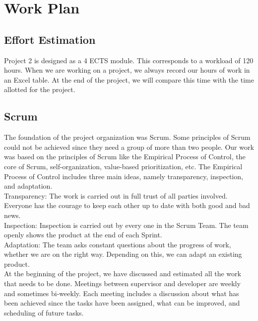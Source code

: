 \documentclass{scrartcl}
\begin{document}
\section{Work Plan}
  		\subsection{Effort Estimation}
  		
  		Project 2  is designed as a 4 ECTS module. This corresponds to a workload of 120 hours. When we are working on a project, we always record our hours of work in an Excel table.
 At the end of the project, we will compare this time with the time allotted for the project. 		
  		
  		
  		
  		
  		
 	    \subsection{Scrum}  	
 	    The foundation of the project organization was Scrum.
 	    Some principles of Scrum could not be achieved since they need a group of more than two people. 
 	    Our work was based on the principles of Scrum like the Empirical Process of Control, the core of Scrum, self-organization, value-based prioritization, etc.
 	    The Empirical Process of Control includes three main ideas, namely transparency, inspection, and adaptation. \\
 	    Transparency: The work is carried out in full trust of all parties involved. Everyone has the courage to keep each other up to date with both good and bad news. \\ 
 	    Inspection: Inspection is carried out by every one in the Scrum Team. The team openly shows the product at the end of each Sprint.			 \\
 	    Adaptation: The team asks constant questions about the progress of work, whether we are on the right way. Depending on this, we can adapt an existing product.		 \\
 	    
 	    At the beginning of the project, we have discussed and estimated all the work that needs to be done. 
 	    Meetings between supervisor and developer are weekly and sometimes bi-weekly.
 	    Each meeting includes a discussion about what has been achieved 
 	    since the tasks have been assigned, what can be improved, and scheduling of future tasks.
 	    
 	    
 	    
\end{document}
